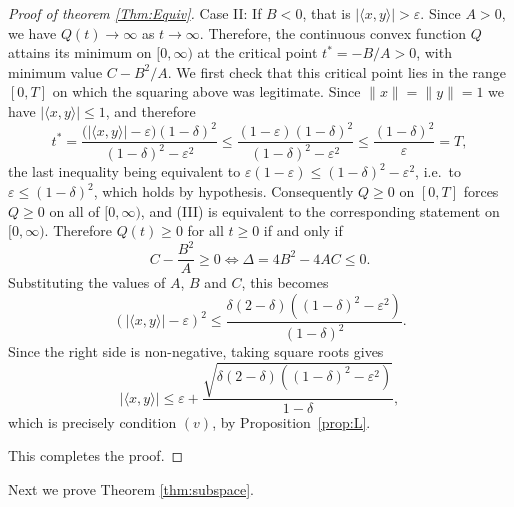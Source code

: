 \documentclass[11pt, reqno]{amsart}
\theoremstyle{definition}
\begin{document}
\begin{proof}[Proof of theorem \ref{Thm:Equiv}]
\noindent Case II: If $B<0$, that is 
$|\langle x,y\rangle|>\varepsilon$. Since $A>0$, we have $Q(t)\to\infty$ as $t\to\infty$.
Therefore, the continuous convex function $Q$ attains its minimum on
$[0,\infty)$ at the critical point $t^*=-B/A>0$, with minimum value $C-B^2/A$. We first check that this critical point lies in the range $[0,T]$ on which the 
squaring above was legitimate. Since $\|x\|=\|y\|=1$ we have 
$|\langle x,y\rangle|\leq 1$, and therefore
\[
t^*=\frac{\bigl(|\langle x,y\rangle|-\varepsilon\bigr)(1-\delta)^2}
{(1-\delta)^2-\varepsilon^2}
\leq \frac{(1-\varepsilon)(1-\delta)^2}{(1-\delta)^2-\varepsilon^2}
\leq \frac{(1-\delta)^2}{\varepsilon}=T,
\]
the last inequality being equivalent to 
$\varepsilon(1-\varepsilon)\leq (1-\delta)^2-\varepsilon^2$, i.e.\ to 
$\varepsilon\leq (1-\delta)^2$, which holds by hypothesis. Consequently $Q\geq 0$ on 
$[0,T]$ forces $Q\geq 0$ on all of $[0,\infty)$, and (III) is equivalent to the 
corresponding statement on $[0,\infty)$. Therefore 
$Q(t)\geq 0$ for all $t\geq 0$ if and only if
\[
C-\frac{B^2}{A}\geq 0\iff \Delta=4B^2-4AC\leq 0.
\]
Substituting the values of $A$, $B$ and $C$, this becomes
\[
\left(|\langle x,y\rangle|-\varepsilon\right)^2\leq
\frac{\delta(2-\delta)\left((1-\delta)^2-\varepsilon^2\right)}{(1-\delta)^2}.
\]
Since the right side is non-negative, taking square roots gives
\[
|\langle x,y\rangle|\leq\varepsilon+
\frac{\sqrt{\delta(2-\delta)\left((1-\delta)^2-\varepsilon^2\right)}}
{1-\delta},
\]
which is precisely condition $(v)$, by Proposition~\ref{prop:L}.
\bigskip

\noindent This completes the proof.
\end{proof}






\noindent Next we prove Theorem \ref{thm:subspace}.
\end{document}
